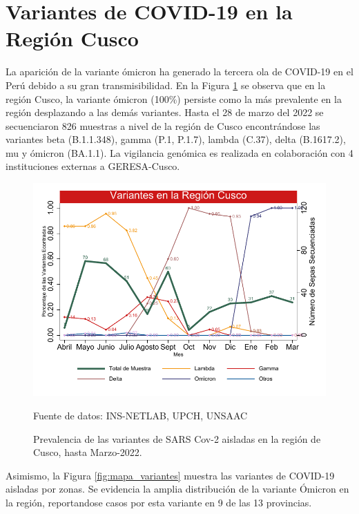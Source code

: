 \documentclass[12pt,a4paper,openany]{book}
\begin{document}
		\section* {Variantes de COVID-19 en la Región Cusco}
		\noindent La aparición de la variante ómicron ha generado la tercera ola de COVID-19 en el Perú debido a su gran transmisibilidad. En la Figura \ref{fig:variantes} se observa que en la región Cusco, la variante ómicron (100$\%$) persiste como la más prevalente en la región desplazando a las demás variantes.
		Hasta el 28 de marzo del 2022 se secuenciaron 826 muestras a nivel de la región de Cusco	encontrándose las variantes beta (B.1.1.348), gamma (P.1, P.1.7), lambda (C.37), delta (B.1617.2), mu y ómicron (BA.1.1). 
		La vigilancia genómica es realizada en colaboración con 4 instituciones externas a GERESA-Cusco.
						
		\begin{figure}[h]
			\caption{Prevalencia de las variantes de SARS Cov-2 aisladas en la región de Cusco, hasta Marzo-2022. }\label{fig:variantes}
			\begin{center}
				\includegraphics[width=0.85\linewidth]{../figuras/variantes.pdf}
			\end{center}
			{\footnotesize {Fuente de datos: INS-NETLAB, UPCH, UNSAAC}}
		\end{figure}
		
	Asimismo, la Figura \ref{fig:mapa_variantes} muestra las variantes de COVID-19 aisladas por zonas. Se evidencia la amplia distribución de la variante Ómicron en la región, reportandose casos por esta variante en 9 de las 13 provincias. 
	
\end{document}
